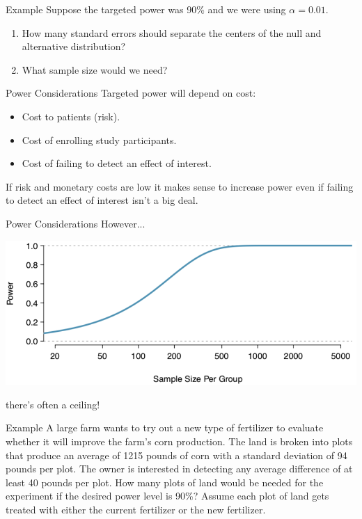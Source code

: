 \begin{frame}{Example}
    Suppose the targeted power was 90\% and we were using $\alpha = 0.01$. 
    
    \begin{enumerate}
        \item How many standard errors should separate the centers of the null and alternative distribution?
        \item What sample size would we need?
    \end{enumerate}
\end{frame}

\begin{frame}{Power Considerations}
    Targeted power will depend on cost:
    \begin{itemize}
        \item Cost to patients (risk).
        \item Cost of enrolling study participants.
        \item Cost of failing to detect an effect of interest.
    \end{itemize}
    If risk and monetary costs are low it makes sense to increase power even if failing to detect an effect of interest isn't a big deal.
\end{frame}

\begin{frame}{Power Considerations}
    However...
    \begin{center}
        \includegraphics[scale=0.3]{images/pwrplot.png}
    \end{center}
    there's often a ceiling!
\end{frame}

\begin{frame}{Example}
    A large farm wants to try out a new type of fertilizer to evaluate whether it will improve the farm's corn production. The land is broken into plots that produce an average of 1215 pounds of corn with a standard deviation of 94 pounds per plot. The owner is interested in detecting any average difference of at least 40 pounds per plot. How many plots of land would be needed for the experiment if the desired power level is 90\%? Assume each plot of land gets treated with either the current fertilizer or the new fertilizer.
\end{frame}
